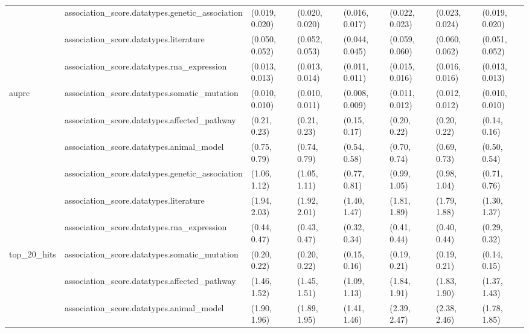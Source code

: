 \begin{table}[H]
{\begin{tabular}{llllllll}
 & association\_score.datatypes.genetic\_association & (0.019, 0.020) & (0.020, 0.020) & (0.016, 0.017) & (0.022, 0.023) & (0.023, 0.024) & (0.019, 0.020)\\

 & association\_score.datatypes.literature & (0.050, 0.052) & (0.052, 0.053) & (0.044, 0.045) & (0.059, 0.060) & (0.060, 0.062) & (0.051, 0.052)\\

 & association\_score.datatypes.rna\_expression & (0.013, 0.013) & (0.013, 0.014) & (0.011, 0.011) & (0.015, 0.016) & (0.016, 0.016) & (0.013, 0.013)\\

\multirow{-6}{*}{\raggedright\arraybackslash auprc} & association\_score.datatypes.somatic\_mutation & (0.010, 0.010) & (0.010, 0.011) & (0.008, 0.009) & (0.011, 0.012) & (0.012, 0.012) & (0.010, 0.010)\\
\cmidrule{1-8}
 & association\_score.datatypes.affected\_pathway & (0.21, 0.23) & (0.21, 0.23) & (0.15, 0.17) & (0.20, 0.22) & (0.20, 0.22) & (0.14, 0.16)\\

 & association\_score.datatypes.animal\_model & (0.75, 0.79) & (0.74, 0.79) & (0.54, 0.58) & (0.70, 0.74) & (0.69, 0.73) & (0.50, 0.54)\\

 & association\_score.datatypes.genetic\_association & (1.06, 1.12) & (1.05, 1.11) & (0.77, 0.81) & (0.99, 1.05) & (0.98, 1.04) & (0.71, 0.76)\\

 & association\_score.datatypes.literature & (1.94, 2.03) & (1.92, 2.01) & (1.40, 1.47) & (1.81, 1.89) & (1.79, 1.88) & (1.30, 1.37)\\

 & association\_score.datatypes.rna\_expression & (0.44, 0.47) & (0.43, 0.47) & (0.32, 0.34) & (0.41, 0.44) & (0.40, 0.44) & (0.29, 0.32)\\

\multirow{-6}{*}{\raggedright\arraybackslash top\_20\_hits} & association\_score.datatypes.somatic\_mutation & (0.20, 0.22) & (0.20, 0.22) & (0.15, 0.16) & (0.19, 0.21) & (0.19, 0.21) & (0.14, 0.15)\\
\cmidrule{1-8}
 & association\_score.datatypes.affected\_pathway & (1.46, 1.52) & (1.45, 1.51) & (1.09, 1.13) & (1.84, 1.91) & (1.83, 1.90) & (1.37, 1.43)\\

 & association\_score.datatypes.animal\_model & (1.90, 1.96) & (1.89, 1.95) & (1.41, 1.46) & (2.39, 2.47) & (2.38, 2.46) & (1.78, 1.85)\\


\end{tabular}}
\end{table}
